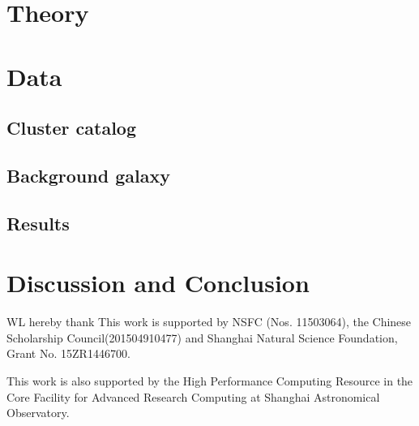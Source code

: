 \documentclass[apj]{emulateapj}
\begin{document}
\section{Theory}

\section{Data}
\label{sec_method}



\subsection{Cluster catalog}



\subsection{Background galaxy}



\subsection{Results}







\section{Discussion and Conclusion}
\label{sec_summary}




\acknowledgements

WL hereby thank   This work
is supported by  NSFC
(Nos. 11503064), the  Chinese Scholarship
Council(201504910477) and Shanghai Natural
Science Foundation, Grant No. 15ZR1446700.

This work is also supported by the High Performance Computing Resource
in the Core Facility for Advanced Research Computing at Shanghai
Astronomical Observatory.





%
\end{document}
